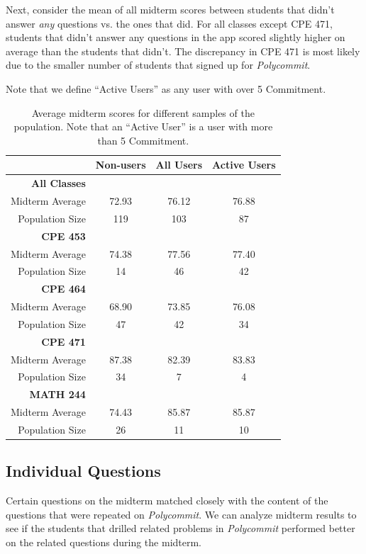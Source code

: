  \par Next, consider the mean of all midterm scores between students that didn't answer \textit{any} questions vs. the ones that did. For all classes except CPE 471, students that didn't answer any questions in the app scored slightly higher on average than the students that didn't. The discrepancy in CPE 471 is most likely due to the smaller number of students that signed up for \textit{Polycommit}.
 
 \par Note that we define ``Active Users'' as any user with over 5 Commitment. 
  
  \begin{table}
 \begin{tabular}[h]{ r c c c}
  & \textbf{Non-users} & \textbf{All Users} & \textbf{Active Users} \\
  \hline
  \textbf{All Classes} & & & \\
  Midterm Average & 72.93 & 76.12 & 76.88 \\
  Population Size & 119 & 103 & 87 \\
  \hline
  \textbf{CPE 453} & & & \\
 Midterm Average & 74.38 & 77.56 & 77.40 \\
 Population Size & 14 & 46 & 42 \\
 \hline
 \textbf{CPE 464} & & & \\
 Midterm Average & 68.90 & 73.85 & 76.08 \\
 Population Size & 47 & 42 & 34 \\
 \hline
 \textbf{CPE 471} & & & \\
 Midterm Average & 87.38 & 82.39 & 83.83 \\
 Population Size & 34 & 7 & 4 \\
 \hline
 \textbf{MATH 244} & & & \\
 Midterm Average & 74.43 & 85.87 & 85.87 \\
 Population Size & 26 & 11 & 10 \\
 
\end{tabular}
\caption{Average midterm scores for different samples of the population. Note that an ``Active User'' is a user with more than 5 Commitment.}
\end{table}

\subsection{Individual Questions}
Certain questions on the midterm matched closely with the content of the questions that were repeated on \textit{Polycommit}. We can analyze midterm results to see if the students that drilled related problems in \textit{Polycommit} performed better on the related questions during the midterm.

